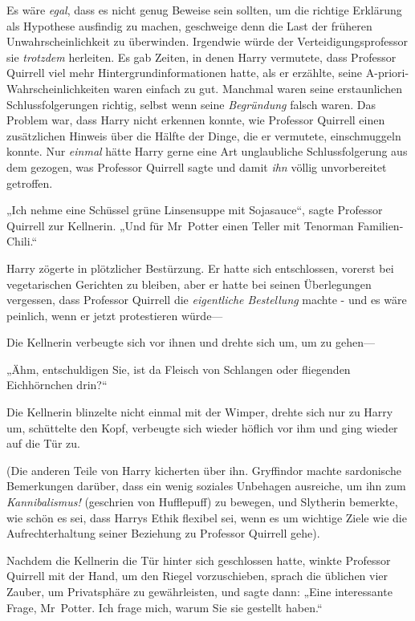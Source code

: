 {Es wäre \emph{egal}, dass es nicht genug Beweise sein sollten, um die richtige Erklärung als Hypothese ausfindig zu machen, geschweige denn die Last der früheren Unwahrscheinlichkeit zu überwinden. Irgendwie würde der Verteidigungsprofessor sie \emph{trotzdem} herleiten. Es gab Zeiten, in denen Harry vermutete, dass Professor Quirrell viel mehr Hintergrundinformationen hatte, als er erzählte, seine A-priori-Wahrscheinlichkeiten waren einfach zu gut. Manchmal waren seine erstaunlichen Schlussfolgerungen richtig, selbst wenn seine \emph{Begründung} falsch waren. Das Problem war, dass Harry nicht erkennen konnte, wie Professor Quirrell einen zusätzlichen Hinweis über die Hälfte der Dinge, die er vermutete, einschmuggeln konnte. Nur \emph{einmal} hätte Harry gerne eine Art unglaubliche Schlussfolgerung aus dem gezogen, was Professor Quirrell sagte und damit \emph{ihn} völlig unvorbereitet getroffen.

„Ich nehme eine Schüssel grüne Linsensuppe mit Sojasauce“, sagte Professor Quirrell zur Kellnerin. „Und für Mr~Potter einen Teller mit Tenorman Familien-Chili.“

Harry zögerte in plötzlicher Bestürzung. Er hatte sich entschlossen, vorerst bei vegetarischen Gerichten zu bleiben, aber er hatte bei seinen Überlegungen vergessen, dass Professor Quirrell die \emph{eigentliche Bestellung} machte - und es wäre peinlich, wenn er jetzt protestieren würde—

Die Kellnerin verbeugte sich vor ihnen und drehte sich um, um zu gehen—

„Ähm, entschuldigen Sie, ist da Fleisch von Schlangen oder fliegenden Eichhörnchen drin?“

Die Kellnerin blinzelte nicht einmal mit der Wimper, drehte sich nur zu Harry um, schüttelte den Kopf, verbeugte sich wieder höflich vor ihm und ging wieder auf die Tür zu.

(Die anderen Teile von Harry kicherten über ihn. Gryffindor machte sardonische Bemerkungen darüber, dass ein wenig soziales Unbehagen ausreiche, um ihn zum \emph{Kannibalismus!} (geschrien von Hufflepuff) zu bewegen, und Slytherin bemerkte, wie schön es sei, dass Harrys Ethik flexibel sei, wenn es um wichtige Ziele wie die Aufrechterhaltung seiner Beziehung zu Professor Quirrell gehe).

Nachdem die Kellnerin die Tür hinter sich geschlossen hatte, winkte Professor Quirrell mit der Hand, um den Riegel vorzuschieben, sprach die üblichen vier Zauber, um Privatsphäre zu gewährleisten, und sagte dann: „Eine interessante Frage, Mr~Potter. Ich frage mich, warum Sie sie gestellt haben.“

}
